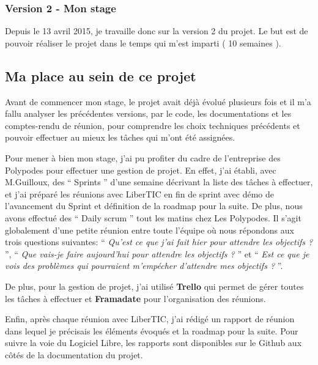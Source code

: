 \subsubsection*{Version 2 - Mon stage}

Depuis le 13 avril 2015, je travaille donc sur la version 2 du projet. Le but est de pouvoir réaliser le projet dans le temps qui m'est imparti ( 10 semaines ).

\subsection{Ma place au sein de ce projet}

Avant de commencer mon stage, le projet avait déjà évolué plusieurs fois et il m'a fallu analyser les précédentes versions, par le code, les documentations et les comptes-rendu de réunion, pour comprendre les choix techniques précédents et pouvoir effectuer au mieux les tâches qui m'ont été assignées.

Pour mener à bien mon stage, j'ai pu profiter du cadre de l'entreprise des Polypodes pour effectuer une gestion de projet. En effet, j'ai établi, avec M.Guilloux, des `` Sprints '' d'une semaine décrivant la liste des tâches à effectuer, et j'ai préparé les réunions avec LiberTIC en fin de sprint avec démo de l'avancement du Sprint et définition de la roadmap pour la suite. De plus, nous avons effectué des `` Daily scrum '' tout les matins chez Les Polypodes. Il s'agit globalement d'une petite réunion entre toute l'équipe où nous répondons aux trois questions suivantes: `` \textit{Qu'est ce que j'ai fait hier pour attendre les objectifs ?} '', `` \textit{Que vais-je faire aujourd'hui pour attendre les objectifs ?} '' et `` \textit{Est ce que je vois des problèmes qui pourraient m'empécher d'attendre mes objectifs ?} ''.

De plus, pour la gestion de projet, j'ai utilisé \textbf{Trello} qui permet de gérer toutes les tâches à effectuer et \textbf{Framadate} pour l'organisation des réunions.

Enfin, après chaque réunion avec LiberTIC, j'ai rédigé un rapport de réunion dans lequel je précisais les éléments évoqués et la roadmap pour la suite. Pour suivre la voie du Logiciel Libre, les rapports sont disponibles sur le Github aux côtés de la documentation du projet.
